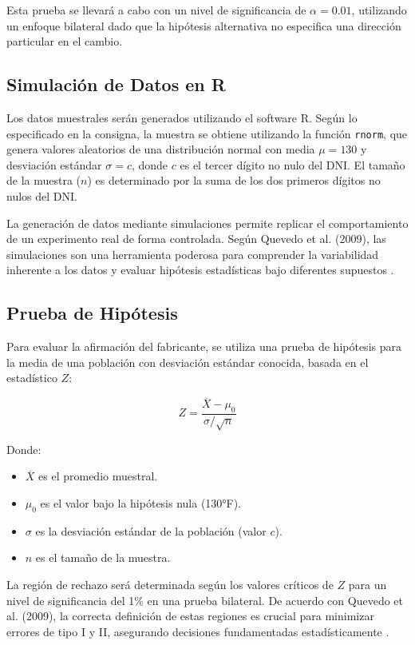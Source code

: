 \documentclass[a4paper,12pt]{article}
\begin{document}
Esta prueba se llevará a cabo con un nivel de significancia de \( \alpha = 0.01 \), utilizando un enfoque bilateral dado que la hipótesis alternativa no especifica una dirección particular en el cambio.

\subsection{Simulación de Datos en R}
Los datos muestrales serán generados utilizando el software R. Según lo especificado en la consigna, la muestra se obtiene utilizando la función \texttt{rnorm}, que genera valores aleatorios de una distribución normal con media \(\mu = 130\) y desviación estándar \(\sigma = c\), donde \(c\) es el tercer dígito no nulo del DNI. El tamaño de la muestra (\(n\)) es determinado por la suma de los dos primeros dígitos no nulos del DNI.

La generación de datos mediante simulaciones permite replicar el comportamiento de un experimento real de forma controlada. Según Quevedo et al. (2009), las simulaciones son una herramienta poderosa para comprender la variabilidad inherente a los datos y evaluar hipótesis estadísticas bajo diferentes supuestos \cite{quevedo2009}.

\subsection{Prueba de Hipótesis}
Para evaluar la afirmación del fabricante, se utiliza una prueba de hipótesis para la media de una población con desviación estándar conocida, basada en el estadístico \(Z\):

\[
Z = \frac{\overline{X} - \mu_0}{\sigma / \sqrt{n}}
\]

Donde:
\begin{itemize}
    \item \(\overline{X}\) es el promedio muestral.
    \item \(\mu_0\) es el valor bajo la hipótesis nula (130°F).
    \item \(\sigma\) es la desviación estándar de la población (valor \(c\)).
    \item \(n\) es el tamaño de la muestra.
\end{itemize}

La región de rechazo será determinada según los valores críticos de \(Z\) para un nivel de significancia del 1\% en una prueba bilateral. De acuerdo con Quevedo et al. (2009), la correcta definición de estas regiones es crucial para minimizar errores de tipo I y II, asegurando decisiones fundamentadas estadísticamente \cite{quevedo2009}.
\end{document}

